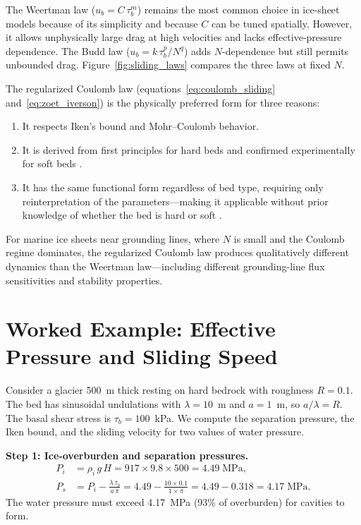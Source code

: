\documentclass[11pt]{article}
\begin{document}
The Weertman law ($u_b = C\,\tau_b^m$) remains the most common choice in ice-sheet models because of its simplicity and because $C$ can be tuned spatially.  However, it allows unphysically large drag at high velocities and lacks effective-pressure dependence.  The Budd law ($u_b = k\,\tau_b^p / N^q$) adds $N$-dependence but still permits unbounded drag.  Figure~\ref{fig:sliding_laws} compares the three laws at fixed $N$.

\medskip
\noindent The regularized Coulomb law (equations~\ref{eq:coulomb_sliding} and~\ref{eq:zoet_iverson}) is the physically preferred form for three reasons:
\begin{enumerate}
  \item It respects Iken's bound and Mohr--Coulomb behavior.
  \item It is derived from first principles for hard beds \cite{Schoof2005} and confirmed experimentally for soft beds \cite{ZoetIverson2020}.
  \item It has the same functional form regardless of bed type, requiring only reinterpretation of the parameters---making it applicable without prior knowledge of whether the bed is hard or soft \cite{MinchewJoughin2020}.
\end{enumerate}

\noindent For marine ice sheets near grounding lines, where $N$ is small and the Coulomb regime dominates, the regularized Coulomb law produces qualitatively different dynamics than the Weertman law---including different grounding-line flux sensitivities and stability properties.

\section{Worked Example: Effective Pressure and Sliding Speed}
\label{sec:example}

Consider a glacier 500~m thick resting on hard bedrock with roughness $R = 0.1$.  The bed has sinusoidal undulations with $\lambda = 10$~m and $a = 1$~m, so $a/\lambda = R$.  The basal shear stress is $\tau_b = 100$~kPa.  We compute the separation pressure, the Iken bound, and the sliding velocity for two values of water pressure.

\medskip
\noindent\textbf{Step 1: Ice-overburden and separation pressures.}
\begin{align}
  P_i &= \rho_i\,g\,H = 917 \times 9.8 \times 500 = 4.49\;\text{MPa}, \\[4pt]
  P_s &= P_i - \frac{\lambda\,\tau_b}{a\,\pi} = 4.49 - \frac{10 \times 0.1}{1 \times \pi} = 4.49 - 0.318 = 4.17\;\text{MPa}.
\end{align}
The water pressure must exceed 4.17~MPa (93\% of overburden) for cavities to form.
\end{document}
